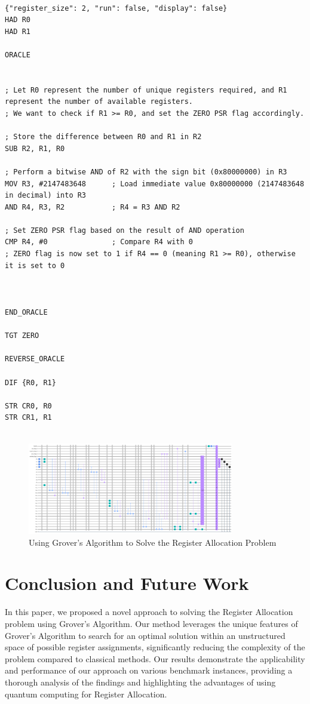 \begin{lstlisting}

{"register_size": 2, "run": false, "display": false}
HAD R0
HAD R1

ORACLE


; Let R0 represent the number of unique registers required, and R1 represent the number of available registers.
; We want to check if R1 >= R0, and set the ZERO PSR flag accordingly.

; Store the difference between R0 and R1 in R2
SUB R2, R1, R0

; Perform a bitwise AND of R2 with the sign bit (0x80000000) in R3
MOV R3, #2147483648      ; Load immediate value 0x80000000 (2147483648 in decimal) into R3
AND R4, R3, R2           ; R4 = R3 AND R2

; Set ZERO PSR flag based on the result of AND operation
CMP R4, #0               ; Compare R4 with 0
; ZERO flag is now set to 1 if R4 == 0 (meaning R1 >= R0), otherwise it is set to 0



END_ORACLE

TGT ZERO

REVERSE_ORACLE

DIF {R0, R1}

STR CR0, R0
STR CR1, R1


\end{lstlisting}

\begin{figure}[htp]
    \centering
    \includegraphics[width=9cm]{Figures/Register_Allocation_circuit.png}
    \caption{Using Grover's Algorithm to Solve the Register Allocation Problem}
    \label{fig:Register_Allocation}
\end{figure}

\section{Conclusion and Future Work} \label{sec:conclusion}

In this paper, we proposed a novel approach to solving the Register Allocation problem using Grover's Algorithm. Our method leverages the unique features of Grover's Algorithm to search for an optimal solution within an unstructured space of possible register assignments, significantly reducing the complexity of the problem compared to classical methods. Our results demonstrate the applicability and performance of our approach on various benchmark instances, providing a thorough analysis of the findings and highlighting the advantages of using quantum computing for Register Allocation.


